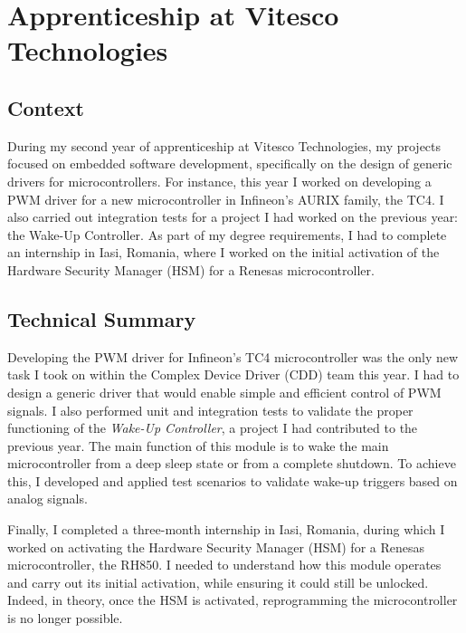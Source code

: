 \section{Apprenticeship at Vitesco Technologies}
\subsection{Context}
\indent \indent During my second year of apprenticeship at Vitesco Technologies, my projects focused on embedded software development, specifically on the design of generic drivers for microcontrollers. For instance, this year I worked on developing a PWM driver for a new microcontroller in Infineon's AURIX family, the TC4. I also carried out integration tests for a project I had worked on the previous year: the Wake-Up Controller.  
As part of my degree requirements, I had to complete an internship in Iasi, Romania, where I worked on the initial activation of the Hardware Security Manager (HSM) for a Renesas microcontroller.

\subsection{Technical Summary}
\indent \indent Developing the PWM driver for Infineon's TC4 microcontroller was the only new task I took on within the Complex Device Driver (CDD) team this year. I had to design a generic driver that would enable simple and efficient control of PWM signals. I also performed unit and integration tests to validate the proper functioning of the \textit{Wake-Up Controller}, a project I had contributed to the previous year. The main function of this module is to wake the main microcontroller from a deep sleep state or from a complete shutdown. To achieve this, I developed and applied test scenarios to validate wake-up triggers based on analog signals.
\vspace{0.25cm}

\noindent Finally, I completed a three-month internship in Iasi, Romania, during which I worked on activating the Hardware Security Manager (HSM) for a Renesas microcontroller, the RH850. I needed to understand how this module operates and carry out its initial activation, while ensuring it could still be unlocked. Indeed, in theory, once the HSM is activated, reprogramming the microcontroller is no longer possible.

